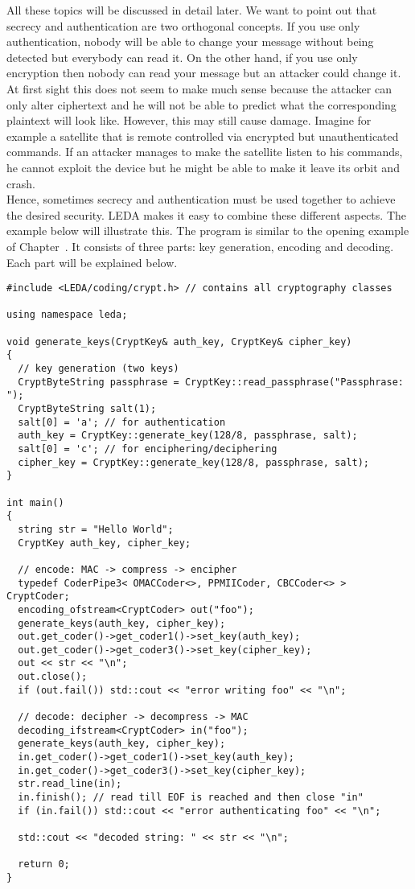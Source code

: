 All these topics will be discussed in detail later. 
We want to point out that secrecy and authentication are two orthogonal
concepts. If you use only authentication, nobody will be able to change your
message without being detected but everybody can read it. On the other hand,
if you use only encryption then nobody can read your message but an attacker
could change it. At first sight this does not seem to make much sense because
the attacker can only alter ciphertext and he will not be able to predict what
the corresponding plaintext will look like. However, this may still cause
damage. Imagine for example a satellite that is remote controlled via encrypted
but unauthenticated commands. If an attacker manages to make the satellite
listen to his commands, he cannot exploit the device but he might be able to 
make it leave its orbit and crash. \\
Hence, sometimes secrecy and authentication must be used together to achieve
the desired security. LEDA makes it easy to combine these different aspects. 
The example below will illustrate this. 
The program is similar to the opening example of Chapter~. It
consists of three parts: key generation, encoding and decoding. Each part will 
be explained below.

\begin{verbatim}
#include <LEDA/coding/crypt.h> // contains all cryptography classes

using namespace leda;

void generate_keys(CryptKey& auth_key, CryptKey& cipher_key)
{
  // key generation (two keys)
  CryptByteString passphrase = CryptKey::read_passphrase("Passphrase: ");
  CryptByteString salt(1);
  salt[0] = 'a'; // for authentication
  auth_key = CryptKey::generate_key(128/8, passphrase, salt);
  salt[0] = 'c'; // for enciphering/deciphering
  cipher_key = CryptKey::generate_key(128/8, passphrase, salt);
}

int main()
{
  string str = "Hello World";
  CryptKey auth_key, cipher_key;

  // encode: MAC -> compress -> encipher
  typedef CoderPipe3< OMACCoder<>, PPMIICoder, CBCCoder<> > CryptCoder;
  encoding_ofstream<CryptCoder> out("foo");
  generate_keys(auth_key, cipher_key);
  out.get_coder()->get_coder1()->set_key(auth_key);
  out.get_coder()->get_coder3()->set_key(cipher_key);
  out << str << "\n";
  out.close();
  if (out.fail()) std::cout << "error writing foo" << "\n";

  // decode: decipher -> decompress -> MAC
  decoding_ifstream<CryptCoder> in("foo");
  generate_keys(auth_key, cipher_key);
  in.get_coder()->get_coder1()->set_key(auth_key);
  in.get_coder()->get_coder3()->set_key(cipher_key);
  str.read_line(in);
  in.finish(); // read till EOF is reached and then close "in"
  if (in.fail()) std::cout << "error authenticating foo" << "\n";

  std::cout << "decoded string: " << str << "\n";

  return 0;
}
\end{verbatim}

